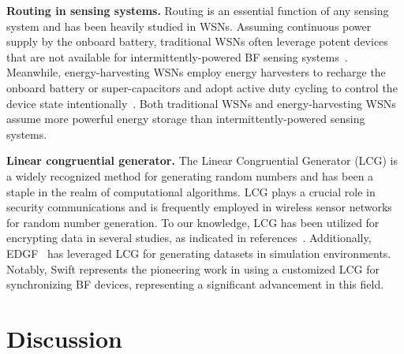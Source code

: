 \documentclass[lettersize,journal]{IEEEtran}
\begin{document}
\textbf{Routing in sensing systems.}
Routing is an essential function of any sensing system and has been heavily studied in WSNs. Assuming continuous power supply by the onboard battery, traditional WSNs often leverage potent devices that are not available for intermittently-powered BF sensing systems~\cite{2020-algo-wsnsurvey, 2021-csur-sync}. Meanwhile, energy-harvesting WSNs employ energy harvesters to recharge the onboard battery or super-capacitors and adopt active duty cycling to control the device state intentionally~\cite{2018-tsn-ehwsn,2009-icnp-esc, 2011-mobihoc-esa ,2016-infocom-panda,2018-infocom-ehwsn,2014-mobihoc-eh,2019-sigcomm-nd, 2022-tmc-das, 2011-mobihoc-esa, 2016-infocom-ehdataprocess}.
Both traditional WSNs and energy-harvesting WSNs assume more powerful energy storage than intermittently-powered sensing systems.

\textbf{Linear congruential generator.} 
The Linear Congruential Generator (LCG) is a widely recognized method for generating random numbers and has been a staple in the realm of computational algorithms. LCG plays a crucial role in security communications and is frequently employed in wireless sensor networks for random number generation. To our knowledge, LCG has been utilized for encrypting data in several studies, as indicated in references~\cite{2023-mtp-smartFa, 2008-cc-rfid, 2020-sensors-smartAg}. Additionally, EDGF~\cite{2021-cc-edfg} has leveraged LCG for generating datasets in simulation environments. Notably, Swift represents the pioneering work in using a customized LCG for synchronizing BF devices, representing a significant advancement in this field.



\section{Discussion}
\label{sec:discussion}
\end{document}
